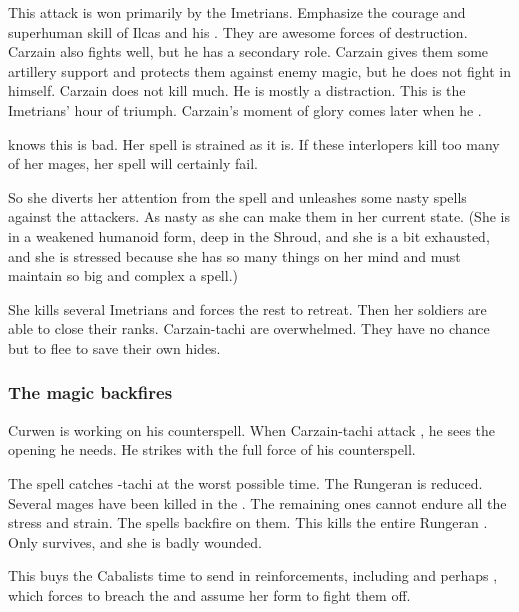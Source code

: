 This attack is won primarily by the Imetrians. 
Emphasize the courage and superhuman skill of Ilcas and his \nycans. 
They are awesome forces of destruction. 
Carzain also fights well, but he has a secondary role. 
Carzain gives them some artillery support and protects them against enemy magic, but he does not fight in \melee himself.
Carzain does not kill much.
He is mostly a distraction. 
This is the Imetrians' hour of triumph. 
Carzain's moment of glory comes later when he . 

\Takestsha knows this is bad.
Her spell is strained as it is.
If these interlopers kill too many of her mages, her spell will certainly fail. 

So she diverts her attention from the spell and unleashes some nasty spells against the attackers.
As nasty as she can make them in her current state. 
(She is in a weakened humanoid form, deep in the Shroud, and she is a bit exhausted, and she is stressed because she has so many things on her mind and must maintain so big and complex a spell.)

She kills several Imetrians and forces the rest to retreat.
Then her soldiers are able to close their ranks.
Carzain-tachi are overwhelmed.
They have no chance but to flee to save their own hides. 





\subsubsection{The \EreshKali magic backfires}
Curwen is working on his counterspell.
When Carzain-tachi attack \Takestsha, he sees the opening he needs. 
He strikes with the full force of his counterspell. 

The spell catches \Takestsha-tachi at the worst possible time. 
The Rungeran \ishrah is reduced. 
Several mages have been killed in the . 
The remaining ones cannot endure all the stress and strain.
The \EreshKali spells backfire on them. 
This kills the entire Rungeran \ishrah{}.
Only \Takestsha survives, and she is badly wounded. 

This buys the Cabalists time to send in reinforcements, including \banes{} and perhaps \resphain, which forces \Nzessuacrith{} to breach the \charade{} and assume her \draconic{} form to fight them off. 

